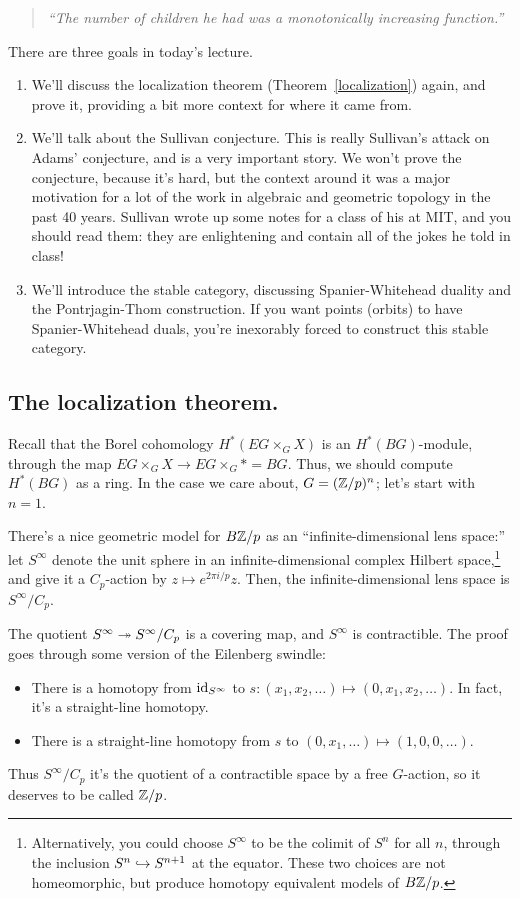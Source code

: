 \begin{quote}\textit{
	``The number of children he had was a monotonically increasing function.''
}\end{quote}
There are three goals in today's lecture.
\begin{enumerate}
	\item We'll discuss the localization theorem (Theorem~\ref{localization}) again, and prove it, providing a bit
	more context for where it came from.
	\item We'll talk about the Sullivan conjecture. This is really Sullivan's attack on Adams' conjecture, and is a
	very important story. We won't prove the conjecture, because it's hard, but the context around it was a major
	motivation for a lot of the work in algebraic and geometric topology in the past 40 years. Sullivan wrote up
	some notes for a class of his at MIT, and you should read them: they are enlightening and contain all of the
	jokes he told in class!
	\item We'll introduce the stable category, discussing Spanier-Whitehead duality and the Pontrjagin-Thom
	construction. If you want points (orbits) to have Spanier-Whitehead duals, you're inexorably forced to
	construct this stable category.
\end{enumerate}
\subsection*{The localization theorem.}
Recall that the Borel cohomology $H^*(EG\times_G X)$ is an $H^*(BG)$-module, through the map $EG\times_G X\to
EG\times_G * = BG$. Thus, we should compute $H^*(BG)$ as a ring. In the case we care about, $G = (\mathbb Z/p)^n$; let's
start with $n = 1$.

There's a nice geometric model for $B\mathbb Z/p$ as an ``infinite-dimensional lens space:'' let $S^\infty$ denote the
unit sphere in an infinite-dimensional complex Hilbert space,\footnote{Alternatively, you could choose $S^\infty$
to be the colimit of $S^n$ for all $n$, through the inclusion $S^n\hookrightarrow S^{n+1}$ at the equator. These two choices
are not homeomorphic, but produce homotopy equivalent models of $B\mathbb Z/p$.} and give it a $C_p$-action by $z\mapsto
e^{2\pi i/p}z$. Then, the infinite-dimensional lens space is $S^\infty/C_p$.

The quotient $S^\infty\twoheadrightarrow S^\infty/C_p$ is a covering map, and $S^\infty$ is contractible. The proof goes through
some version of the Eilenberg swindle:
\begin{itemize}
	\item There is a homotopy from $\mathrm{id}_{S^\infty}$ to $s: (x_1,x_2,\dotsc)\mapsto (0, x_1, x_2, \dotsc)$. In fact,
	it's a straight-line homotopy.
	\item There is a straight-line homotopy from $s$ to $(0,x_1,\dotsc)\mapsto (1, 0, 0,\dotsc)$.
\end{itemize}
Thus $S^\infty/C_p$ it's the quotient of a contractible space by a free $G$-action, so it deserves to be called
$\mathbb Z/p$.

